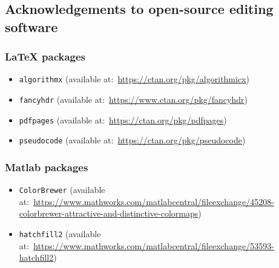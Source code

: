 
\cleardoublepage
{}
{}

\small



\newpage
\subsection*{Acknowledgements to open-source editing software}
\subsubsection*{LaTeX packages}
\begin{itemize}
	\item \texttt{algorithmx} (available at:~\url{https://ctan.org/pkg/algorithmicx})	%
	\item \texttt{fancyhdr} (available at:~\url{https://www.ctan.org/pkg/fancyhdr})
	\item \texttt{pdfpages} (available at:~\url{https://ctan.org/pkg/pdfpages})	%
	\item \texttt{pseudocode} (available at:~\url{https://ctan.org/pkg/pseudocode})
\end{itemize}

\subsubsection*{Matlab packages}
\begin{itemize}
	\item \texttt{ColorBrewer} 	(available at:~\url{https://www.mathworks.com/matlabcentral/fileexchange/45208-colorbrewer-attractive-and-distinctive-colormaps}) %
	\item \texttt{hatchfill2} (available at:~\url{https://www.mathworks.com/matlabcentral/fileexchange/53593-hatchfill2}) %
\end{itemize}